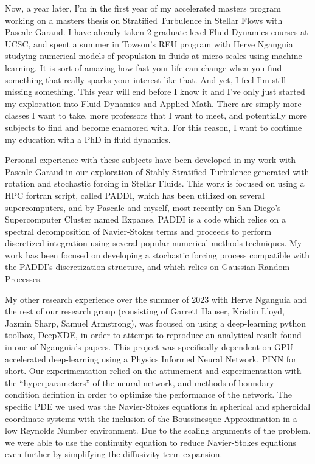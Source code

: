 \documentclass{article}
\begin{document}
Now, a year later, I'm in the first year of my accelerated masters program working on a masters thesis on Stratified Turbulence in Stellar Flows with Pascale Garaud. I have already taken 2 graduate level Fluid Dynamics courses at UCSC, and spent a summer in Towson's REU program with Herve Nganguia studying numerical models of propulsion in fluids at micro scales using machine learning. It is sort of amazing how fast your life can change when you find something that really sparks your interest like that. And yet, I feel I'm still missing something. This year will end before I know it and I've only just started my exploration into Fluid Dynamics and Applied Math. There are simply more classes I want to take, more professors that I want to meet, and potentially more subjects to find and become enamored with. For this reason, I want to continue my education with a PhD in fluid dynamics.
 
Personal experience with these subjects have been developed in my work with Pascale Garaud in our exploration of Stably Stratified Turbulence generated with rotation and stochastic forcing in Stellar Fluids. This work is focused on using a HPC fortran script, called PADDI, which has been utilized on several supercomputers, and by Pascale and myself, most recently on San Diego's Supercomputer Cluster named Expanse. PADDI is a code which relies on a spectral decomposition of Navier-Stokes terms and proceeds to perform discretized integration using several popular numerical methods techniques. My work has been focused on developing a stochastic forcing process compatible with the PADDI's discretization structure, and which relies on Gaussian Random Processes. 

My other research experience over the summer of 2023 with Herve Nganguia and the rest of our research group (consisting of Garrett Hauser, Kristin Lloyd, Jazmin Sharp, Samuel Armstrong), was focused on using a deep-learning python toolbox, DeepXDE, in order to attempt to reproduce an analytical result found in one of Nganguia's papers. This project was specifically dependent on GPU accelerated deep-learning using a Physics Informed Neural Network, PINN for short. Our experimentation relied on the attunement and experimentation with the ``hyperparameters'' of the neural network, and methods of boundary condition defintion in order to optimize the performance of the network. The specific PDE we used was the Navier-Stokes equations in spherical and spheroidal coordinate systems with the inclusion of the Boussinesque Approximation in a low Reynolds Number environment. Due to the scaling arguments of the problem, we were able to use the continuity equation to reduce Navier-Stokes equations even further by simplifying the diffusivity term expansion.
\end{document}
